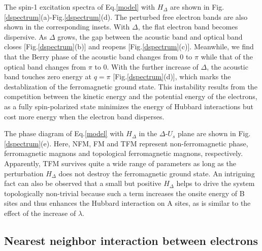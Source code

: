 \documentclass[amsmath,superscriptaddress,showpacs,aps,prb,twocolumn]{revtex4-1}
\begin{document}
\par The spin-1 excitation spectra of Eq.\ref{model} with $H_\Delta$ are shown in Fig.\ref{dspectrum}(a)-Fig.\ref{dspectrum}(d). The perturbed free electron bands are also shown in the corresponding insets. With $\Delta$, the flat electron band becomes dispersive. As $\Delta$ grows, the gap between the acoustic band and optical band closes [Fig.\ref{dspectrum}(b)] and reopens [Fig.\ref{dspectrum}(c)]. Meanwhile, we find that the Berry phase of the acoustic band changes from $0$ to $\pi$ while that of the optical band changes from $\pi$ to $0$. With the further increase of $\Delta$, the acoustic band touches zero energy at $q=\pi$ [Fig.\ref{dspectrum}(d)], which marks the destablization of the ferromagnetic ground state. This instability results from the competition between the kinetic energy and the potential energy of the electrons, as a fully spin-polarized state minimizes the energy of Hubbard interactions but cost more energy when the electron band disperses.

\par The phase diagram of Eq.\ref{model} with $H_\Delta$ in the $\Delta$-$U_s$ plane are shown in Fig.\ref{dspectrum}(e). Here, NFM, FM and TFM represent non-ferromagnetic phase, ferromagnetic magnons and topological ferromagnetic magnons, respectively. Apparently, TFM survives quite a wide range of parameters as long as the perturbation $H_\Delta$ does not destroy the ferromagnetic ground state. An intriguing fact can also be observed that a small but positive $H_\Delta$ helps to drive the system topologically non-trivial because such a term increases the onsite energy of B sites and thus enhances the Hubbard interaction on A sites, as is similar to the effect of the increase of $\lambda$.

\subsection{Nearest neighbor interaction between electrons}
\end{document}

